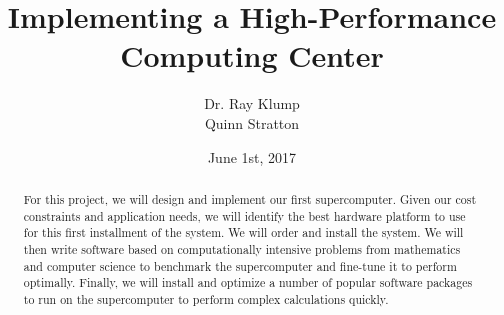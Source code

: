 \documentclass{article}
\title{Implementing a High-Performance Computing Center}
\author{Dr. Ray Klump\\Quinn Stratton}
\date{June 1st, 2017}
\begin{document}
\maketitle
\begin{abstract}
For this project, we will design and implement our first supercomputer. Given our cost constraints and application needs, we will identify the best hardware platform to use for this first installment of the system. We will order and install the system. We will then write software based on computationally intensive problems from mathematics and computer science to benchmark the supercomputer and fine-tune it to perform optimally. Finally, we will install and optimize a number of popular software packages to run on the supercomputer to perform complex calculations quickly.
\end{abstract}
\end{document}

